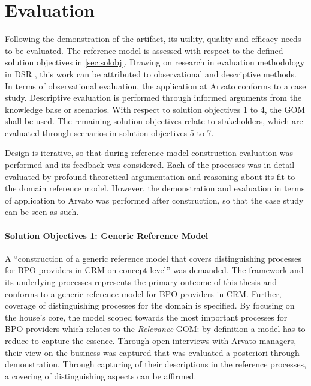 
\chapter{Evaluation}

Following the demonstration of the artifact, its utility, quality and efficacy needs to be evaluated.  The reference model is assessed with respect to the defined solution objectives in \ref{sec:solobj}. Drawing on research in evaluation methodology in \acrshort{DSR} \citep[]{Hevner2004}, this work can be attributed to observational and descriptive methods. In terms of observational evaluation, the application at Arvato conforms to a case study. Descriptive evaluation is performed through informed arguments from the knowledge base or scenarios. With respect to solution objectives 1 to 4, the \acrfull{GOM} shall be used. The remaining solution objectives relate to stakeholders, which are evaluated through scenarios in solution objectives 5 to 7.

Design is iterative, so that during reference model construction evaluation was performed and its feedback was considered. Each of the processes was in detail evaluated by profound theoretical argumentation and reasoning about its fit to the domain reference model. However, the demonstration and evaluation in terms of application to Arvato was performed after construction, so that the case study can be seen as such. 


\subsubsection{Solution Objectives 1: Generic Reference Model}

A \enquote{construction of a generic reference model that covers distinguishing processes
	for BPO providers in CRM on concept level} was demanded. The framework and its underlying processes represents the primary outcome of this thesis and conforms to a generic reference model for BPO providers in CRM. Further, coverage of distinguishing processes for the domain is specified. By focusing on the house's core, the model scoped towards the most important processes for BPO providers which relates to the \textit{Relevance} \acrshort{GOM}: by definition a model has to reduce to capture the essence. Through open interviews with Arvato managers, their view on the business was captured that was evaluated a posteriori through demonstration. Through capturing of their descriptions in the reference processes, a covering of distinguishing aspects can be affirmed. 

